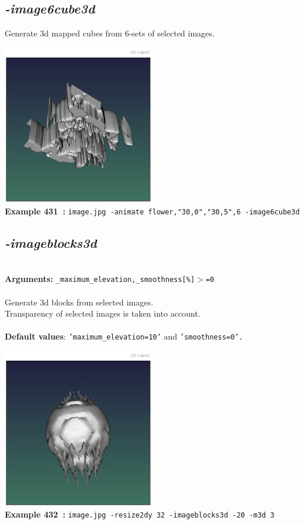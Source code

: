 \documentclass[a4paper,11pt,twoside]{book}
\begin{document}
\subsection{\emph{-image6cube3d} }\vspace*{-0.5em}
Generate 3d mapped cubes from 6-sets of selected images.
\begin{center}\includegraphics[keepaspectratio=true,height=7cm,width=\textwidth]{img/gmic_def431.jpg}\\
{\footnotesize \textbf{Example 431~:} \texttt{image.jpg -animate flower,"30,0","30,5",6 -image6cube3d}}
\end{center}

\subsection{\emph{-imageblocks3d} }\vspace*{-0.5em}
~\\\textbf{Arguments: } 
{\small \texttt{\_maximum\_elevation,\_smoothness[\%]$>$=0}}\\~\\
Generate 3d blocks from selected images.
~\\Transparency of selected images is taken into account.
~\\~\\\textbf{Default values}: {\small \texttt{'maximum\_elevation=10'} and \texttt{'smoothness=0'.}}
\begin{center}\includegraphics[keepaspectratio=true,height=7cm,width=\textwidth]{img/gmic_def432.jpg}\\
{\footnotesize \textbf{Example 432~:} \texttt{image.jpg -resize2dy 32 -imageblocks3d -20 -m3d 3}}
\end{center}
\end{document}
